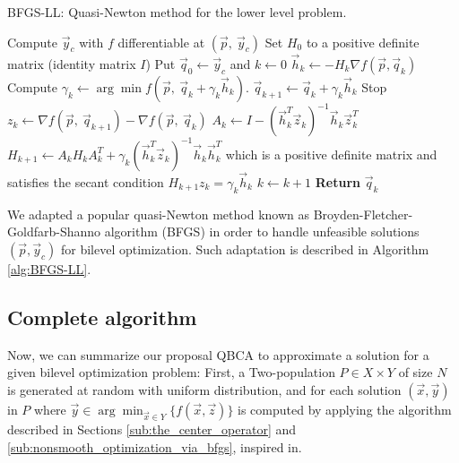 \documentclass[conference]{IEEEtran}
\theoremstyle{definition}
\begin{document}
\begin{algorithm}[!ht]
    \caption{BFGS-LL: Quasi-Newton method for the lower level problem.}
    \label{alg:BFGS-LL}
    \begin{algorithmic}[1]
        \STATE Compute $\vec{y}_c$ with $f$ differentiable at $(\vec{p},\ \vec{y}_c)$
        \STATE Set $H_0$ to a positive definite matrix (identity matrix $I$)
        \STATE Put $\vec{q}_0 \gets \vec{y}_c$ and $k \gets 0$
            \STATE $\vec{h}_k \gets -H_k\nabla f(\vec{p}, \vec{q}_k)$
            \STATE Compute $\gamma_{k}\gets\arg \min f(\vec{p}, \ \vec{q} _{k}+ \gamma_k \vec{h} _{k})$.
            \STATE $\vec{q}_{k+1} \gets \vec{q}_k  + \gamma_k \vec{h}_k$
                \STATE Stop
            \ENDIF
            \STATE $z_k \gets \nabla f(\vec{p}, \ \vec{q}_{k+1}) - \nabla f(\vec{p}, \ \vec{q}_{k}) $
            \STATE $\displaystyle A_k \gets I - (\vec{h}_k^T \vec{z}_k)^{-1} \vec{h}_k \vec{z}_k^T$
            \STATE $H_{k+1} \gets A_k H_k A_k^T + \gamma_k(\vec{h}_k^T\vec{z}_k)^{-1}\vec{h}_k \vec{h}_k^T$
                   which is a positive definite matrix and satisfies the secant
                   condition $H_{k+1} z_k = \gamma_k \vec{h}_k$
            \STATE $k \gets k + 1$
        \ENDWHILE
        \STATE \textbf{Return} $\vec{q}_k$
    \end{algorithmic}
\end{algorithm}

We adapted a popular quasi-Newton method known as Broyden-Fletcher-Goldfarb-Shanno
algorithm (BFGS) \cite{fletcher2013practical} in order to handle unfeasible
solutions $(\vec{p}, \vec{y}_c)$ for bilevel optimization. Such adaptation is
described in Algorithm \ref{alg:BFGS-LL}. \\
% 

\subsection{Complete algorithm}

Now, we can summarize our proposal QBCA to approximate a solution for a given bilevel
optimization problem: First, a Two-population $P \in X \times Y$ of size $N$ is
generated at random with uniform distribution, and for each solution $(\vec{x}, \vec{y})$
in $P$ where $\vec{y} \in \arg \min_{\vec{x}\in Y} \{ f(\vec{x},\vec{z})\}$
is computed by applying the algorithm described in Sections \ref{sub:the_center_operator}
and \ref{sub:nonsmooth_optimization_via_bfgs}, inspired in\cite{Mejia2018}. 
\end{document}
